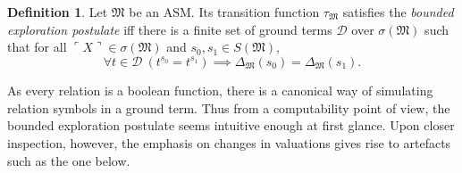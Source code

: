 \documentclass[12pt, twoside]{memoir}
\numberwithin{equation}{section}
\theoremstyle{definition}
\newtheorem{defi}[thm]{Definition}
\theoremstyle{remark}
\theoremstyle{definition}
\theoremstyle{definition}
\theoremstyle{definition}
\theoremstyle{remark}
\begin{document}
\begin{defi}\label{def217}
Let $\mathfrak{M}$ be an ASM. Its transition function $\tau_{\mathfrak{M}}$ satisfies the \emph{bounded exploration postulate} iff there is a finite set of ground terms $\mathcal{D}$ over $\sigma(\mathfrak{M})$ such that for all $\ulcorner X \urcorner \in \sigma(\mathfrak{M})$ and $s_0, s_1 \in S(\mathfrak{M})$,
\begin{equation*}
    \forall t \in \mathcal{D} \ (t^{s_0} = t^{s_1}) \implies \Delta_{\mathfrak{M}}(s_0) = \Delta_{\mathfrak{M}}(s_1) \text{.}
\end{equation*}
\end{defi}

As every relation is a boolean function, there is a canonical way of simulating relation symbols in a ground term. Thus from a computability point of view, the bounded exploration postulate seems intuitive enough at first glance. Upon closer inspection, however, the emphasis on changes in valuations gives rise to artefacts such as the one below.
\end{document}
